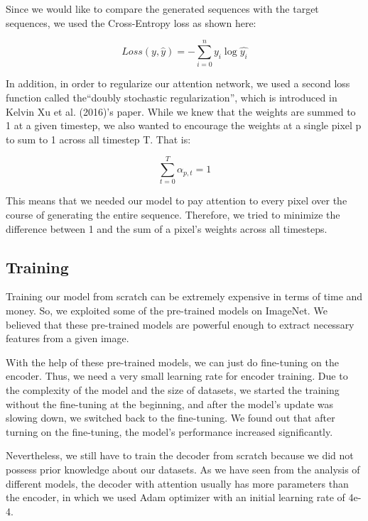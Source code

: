 \documentclass{article}
\begin{document}
Since we would like to compare the generated sequences with the target sequences, we used the Cross-Entropy loss as shown here:

\begin{equation} Loss(y, \hat{y}) = -\sum_{i=0}^n y_{i}\log{\hat{y_{i}}}
\end{equation}

In addition, in order to regularize our attention network, we used a second loss function called the“doubly stochastic regularization”, which is introduced in Kelvin Xu et al. (2016)’s paper. While we knew that the weights are summed to 1 at a given timestep, we also wanted to encourage the weights at a single pixel p to sum to 1 across all timestep T. That is:

\begin{equation} 
\sum_{t=0}^T \alpha_{p, t} = 1
\end{equation}

This means that we needed our model to pay attention to every pixel over the course of generating the entire sequence. Therefore, we tried to minimize the difference between 1 and the sum of a pixel’s weights across all timesteps.

\subsection{Training}

Training our model from scratch can be extremely expensive in terms of time and money. So, we exploited some of the pre-trained models on ImageNet. We believed that these pre-trained models are powerful enough to extract necessary features from a given image. 

With the help of these pre-trained models, we can just do fine-tuning on the encoder. Thus, we need a very small learning rate for encoder training. Due to the complexity of the model and the size of datasets, we started the training without the fine-tuning at the beginning, and after the model’s update was slowing down, we switched back to the fine-tuning. We found out that after turning on the fine-tuning, the model’s performance increased significantly.

Nevertheless, we still have to train the decoder from scratch because we did not possess prior knowledge about our datasets. As we have seen from the analysis of different models, the decoder with attention usually has more parameters than the encoder, in which we used Adam optimizer with an initial learning rate of 4e-4.
\end{document}
